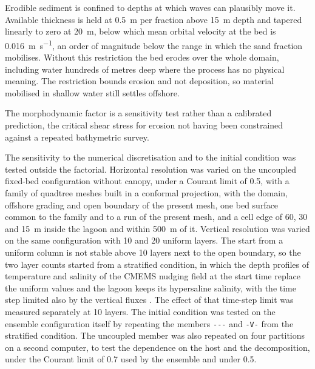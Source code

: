 Erodible sediment is confined to depths at which waves can plausibly move it.
Available thickness is held at 0.5~m per fraction above 15~m depth and tapered
linearly to zero at 20~m, below which mean orbital velocity at the bed is
0.016~\si{\metre\per\second}, an order of magnitude below the range in which
the sand fraction mobilises. Without this restriction the bed erodes over the
whole domain, including water hundreds of metres deep where the process has no
physical meaning. The restriction bounds erosion and not deposition, so material
mobilised in shallow water still settles offshore.

The morphodynamic factor is a sensitivity test rather than a calibrated
prediction, the critical shear stress for erosion not having been constrained
against a repeated bathymetric survey.

The sensitivity to the numerical discretisation and to the initial condition
was tested outside the factorial. Horizontal resolution was varied on the
uncoupled fixed-bed configuration without canopy, under a Courant limit of 0.5,
with a family of quadtree meshes built in a conformal projection, with the
domain, offshore grading and open boundary of the present mesh, one bed surface
common to the family and to a run of the present mesh, and a cell edge of 60,
30 and 15~m inside the lagoon and within 500~m of it. Vertical resolution was
varied on the same configuration with 10 and 20 uniform layers. The start from
a uniform column is not stable above 10 layers next to the open boundary, so the
two layer counts started from a stratified condition, in which the depth
profiles of temperature and salinity of the CMEMS nudging field at the start
time replace the uniform values and the lagoon keeps its hypersaline salinity,
with the time step limited
also by the vertical fluxes \citep{Deltares2025}. The effect of that time-step
limit was measured separately at 10 layers. The initial condition was tested on
the ensemble configuration itself by repeating the members
\texttt{{-}{-}{-}} and \texttt{{-}V{-}} from the stratified condition. The
uncoupled member was also repeated on four partitions on a second computer, to
test the dependence on the host and the decomposition, under the Courant limit
of 0.7 used by the ensemble and under 0.5.

